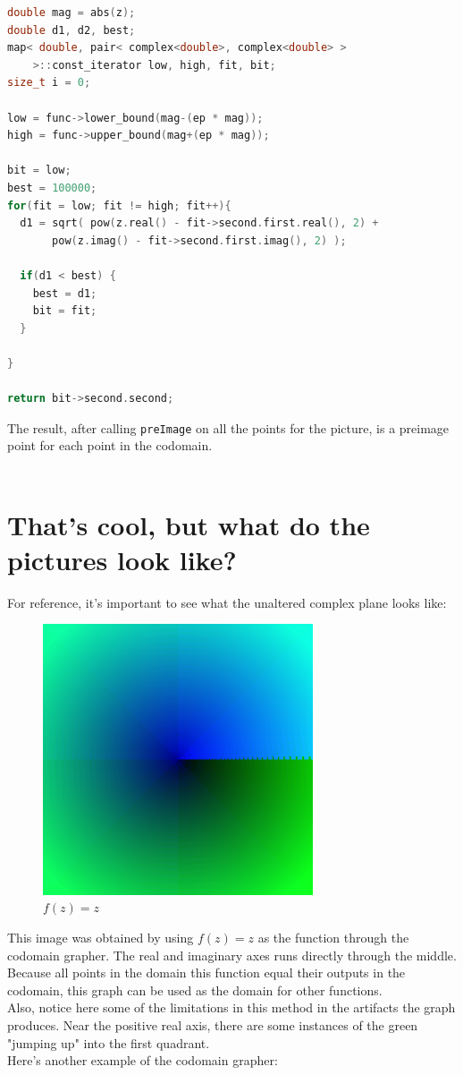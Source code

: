 \documentclass[letterpaper,12pt]{article}
\begin{document}
\begin{lstlisting}[language=c++]
double mag = abs(z);
double d1, d2, best;
map< double, pair< complex<double>, complex<double> >
    >::const_iterator low, high, fit, bit;
size_t i = 0;

low = func->lower_bound(mag-(ep * mag));
high = func->upper_bound(mag+(ep * mag));

bit = low;
best = 100000;
for(fit = low; fit != high; fit++){
  d1 = sqrt( pow(z.real() - fit->second.first.real(), 2) +
       pow(z.imag() - fit->second.first.imag(), 2) );

  if(d1 < best) {
    best = d1;
    bit = fit;
  }

}

return bit->second.second;

\end{lstlisting}

The result, after calling \verb|preImage| on all the points for the picture, is a preimage point for each point in the codomain. \\ \\

\section{That's cool, but what do the pictures look like?}

For reference, it's important to see what the unaltered complex plane looks like:

\begin{figure}[h]
	\includegraphics[width=8cm]{f(z)=z}
	\centering
	\caption{\small$f(z) = z$}
	\centering
\end{figure}

This image was obtained by using $f(z) = z$ as the function through the codomain grapher.
The real and imaginary axes runs directly through the middle.
Because all points in the domain this function equal their outputs in the codomain, this graph can be used as the domain for other functions.
\\
Also, notice here some of the limitations in this method in the artifacts the graph produces.
Near the positive real axis, there are some instances of the green "jumping up" into the first quadrant.
\\
Here's another example of the codomain grapher:
\end{document}
